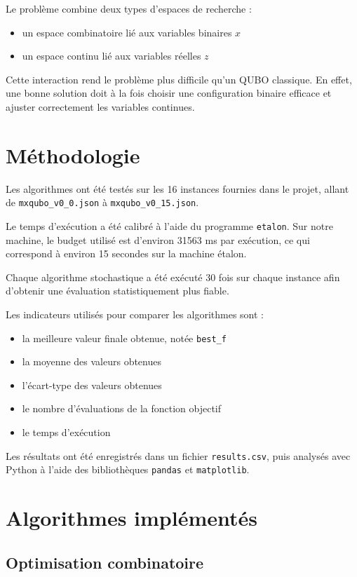 \documentclass[a4paper,11pt]{article}
\begin{document}
Le problème combine deux types d'espaces de recherche :
\begin{itemize}
    \item un espace combinatoire lié aux variables binaires $x$
    \item un espace continu lié aux variables réelles $z$
\end{itemize}

Cette interaction rend le problème plus difficile qu'un QUBO classique. 
En effet, une bonne solution doit à la fois choisir une configuration binaire efficace et ajuster correctement les variables continues.

\section{Méthodologie}

Les algorithmes ont été testés sur les 16 instances fournies dans le projet, allant de \texttt{mxqubo\_v0\_0.json} à \texttt{mxqubo\_v0\_15.json}.

Le temps d'exécution a été calibré à l'aide du programme \texttt{etalon}. 
Sur notre machine, le budget utilisé est d'environ 31563 ms par exécution, ce qui correspond à environ 15 secondes sur la machine étalon.

Chaque algorithme stochastique a été exécuté 30 fois sur chaque instance afin d'obtenir une évaluation statistiquement plus fiable.

Les indicateurs utilisés pour comparer les algorithmes sont :
\begin{itemize}
    \item la meilleure valeur finale obtenue, notée \texttt{best\_f}
    \item la moyenne des valeurs obtenues
    \item l'écart-type des valeurs obtenues
    \item le nombre d'évaluations de la fonction objectif
    \item le temps d'exécution
\end{itemize}

Les résultats ont été enregistrés dans un fichier \texttt{results.csv}, puis analysés avec Python à l'aide des bibliothèques \texttt{pandas} et \texttt{matplotlib}.

\section{Algorithmes implémentés}

\subsection{Optimisation combinatoire}
\end{document}
